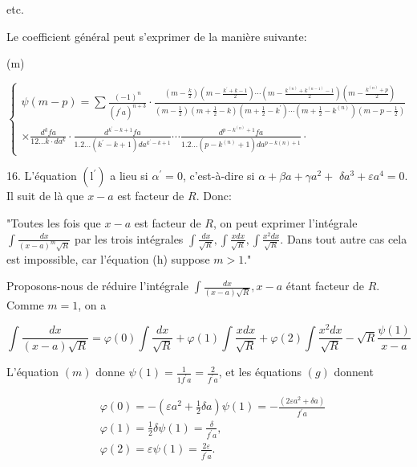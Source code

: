 \documentclass{article}
\begin{document}
etc.

Le coefficient général peut s'exprimer de la manière suivante:

(m)

\[
\left\{\begin{array}{c}
\psi(m-p)=\sum \frac{(-1)^{n}}{\left(f^{\prime} a\right)^{n+3}} \cdot \frac{\left(m-\frac{k}{2}\right)\left(m-\frac{k^{\prime}+k-1}{2}\right) \cdots\left(m-\frac{k^{(n)}+k^{(n-1)}-1}{2}\right)\left(m-\frac{k^{(n)}+p}{2}\right)}{\left(m-\frac{1}{2}\right)\left(m+\frac{1}{2}-k\right)\left(m+\frac{1}{2}-k^{\prime}\right) \cdots\left(m+\frac{1}{2}-k^{(n)}\right)\left(m-p-\frac{1}{2}\right)} \\
\times \frac{d^{k} f a}{12 \ldots k \cdot d a^{k}} \cdot \frac{d^{k^{\prime}-k+1} f a}{1.2 \ldots\left(k^{\prime}-k+1\right) d a^{k^{\prime}-k+1}} \cdots \frac{d^{p-k^{(n)}+1} f a}{1.2 \ldots\left(p-k^{(n)}+1\right) d a^{p-k(n)+1}} \cdot
\end{array}\right.
\]

16. L'équation \(\left(\mathrm{l}^{\prime}\right)\) a lieu si \(\alpha^{\prime}=0\), c'est-à-dire si \(\alpha+\beta a+\gamma a^{2}+\) \(\delta a^{3}+\varepsilon a^{4}=0\). Il suit de là que \(x-a\) est facteur de \(R\). Donc:

"Toutes les fois que \(x-a\) est facteur de \(R\), on peut exprimer l'intégrale \(\int \frac{d x}{(x-a)^{m} \sqrt{R}}\) par les trois intégrales \(\int \frac{d x}{\sqrt{R}}, \int \frac{x d x}{\sqrt{R}}, \int \frac{x^{2} d x}{\sqrt{R}}\). Dans tout autre cas cela est impossible, car l'équation (h) suppose \(m>1\)."

Proposons-nous de réduire l'intégrale \(\int \frac{d x}{(x-a) \sqrt{R}}, x-a\) étant facteur de \(R\). Comme \(m=1\), on a

\[
\int \frac{d x}{(x-a) \sqrt{R}}=\varphi(0) \int \frac{d x}{\sqrt{R}}+\varphi(1) \int \frac{x d x}{\sqrt{R}}+\varphi(2) \int \frac{x^{2} d x}{\sqrt{R}}-\sqrt{R} \frac{\psi(1)}{x-a}
\]

L'équation \((m)\) donne \(\psi(1)=\frac{1}{1 f^{\prime} a}=\frac{2}{f^{\prime} a}\), et les équations \((g)\) donnent

\[
\begin{aligned}
& \varphi(0)=-\left(\varepsilon a^{2}+\frac{1}{2} \delta a\right) \psi(1)=-\frac{\left(2 \varepsilon a^{2}+\delta a\right)}{f^{\prime} a} \\
& \varphi(1)=\frac{1}{2} \delta \psi(1)=\frac{\delta}{f^{\prime} a}, \\
& \varphi(2)=\varepsilon \psi(1)=\frac{2 \varepsilon}{f^{\prime} a} .
\end{aligned}
\]
\end{document}
